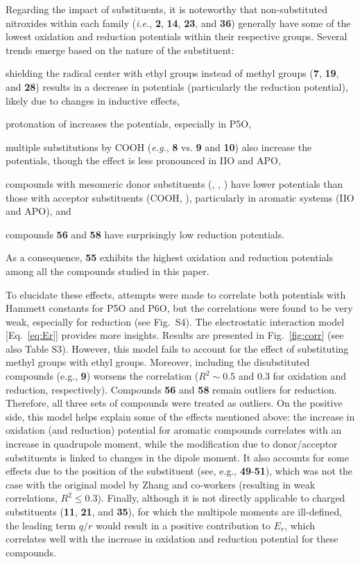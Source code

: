 \documentclass[review]{elsarticle}
\begin{document}
Regarding the impact of substituents, it is noteworthy that non-substituted nitroxides within each family (\textit{i.e.}, \textbf{2}, \textbf{14}, \textbf{23}, and \textbf{36}) generally have some of the lowest oxidation and reduction potentials within their respective groups. Several trends emerge based on the nature of the substituent: \begin{inparaenum}[(i)]
	\item shielding the radical center with ethyl groups instead of methyl groups (\textbf{7}, \textbf{19}, and \textbf{28}) results in a decrease in potentials (particularly the reduction potential), likely due to changes in inductive effects,
	\item protonation of  increases the potentials, especially in P5O,
	\item multiple substitutions by COOH (\textit{e.g.}, \textbf{8} vs. \textbf{9} and \textbf{10}) also increase the potentials, though the effect is less pronounced in IIO and APO,
	\item compounds with mesomeric donor substituents (, , ) have lower potentials than those with acceptor substituents (COOH, ), particularly in aromatic systems (IIO and APO), and
	\item compounds \textbf{56} and \textbf{58} have surprisingly low reduction potentials.
\end{inparaenum}
As a consequence, \textbf{55} exhibits the highest oxidation and reduction potentials among all the compounds studied in this paper.


To elucidate these effects, attempts were made to correlate both potentials with Hammett constants for P5O and P6O, but the correlations were found to be very weak, especially for reduction (see Fig.~S4). The electrostatic interaction model [Eq.~\eqref{eq:Er}] provides more insights. Results are presented in Fig.~\ref{fig:corr} (see also Table S3). However, this model fails to account for the effect of substituting methyl groups with ethyl groups. Moreover, including the disubstituted compounds (e.g., \textbf{9}) worsens the correlation ($R^2 \sim 0.5$ and 0.3 for oxidation and reduction, respectively). Compounds \textbf{56} and \textbf{58} remain outliers for reduction. Therefore, all three sets of compounds were treated as outliers.
On the positive side, this model helps explain some of the effects mentioned above: the increase in oxidation (and reduction) potential for aromatic compounds correlates with an increase in quadrupole moment, while the modification due to donor/acceptor substituents is linked to changes in the dipole moment. It also accounts for some effects due to the position of the substituent (see, e.g., \textbf{49}-\textbf{51}), which was not the case with the original model by Zhang and co-workers (resulting in weak correlations, $R^2 \leq 0.3$).
Finally, although it is not directly applicable to charged substituents (\textbf{11}, \textbf{21}, and \textbf{35}), for which the multipole moments are ill-defined, the leading term $q/r$ would result in a positive contribution to $E_r$, which correlates well with the increase in oxidation and reduction potential for these compounds.
\end{document}
